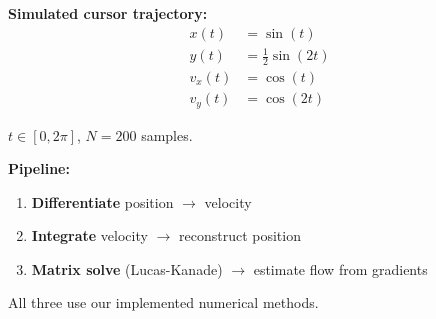 \documentclass[a4paper,landscape,12pt]{extarticle}
\newif\ifshownotes
\newcommand{\speakernotes}[2]{%
  \ifshownotes
    \vfill
    \begin{tcolorbox}[
      colback=gray!8, colframe=gray!50,
      title={\textbf{Speaker: #1} --- Verbatim Script},
      fonttitle=\large, fontupper=\normalsize,
      left=6pt, right=6pt, top=4pt, bottom=4pt
    ]
    #2
    \end{tcolorbox}
  \fi
}
\begin{document}
\begin{huge}
\leftskip 0.7in \rightskip 0.7in
\vspace{0.05in}

\begin{multicols}{2}
\textbf{Simulated cursor trajectory:}
\begin{align*}
x(t) &= \sin(t) \\
y(t) &= \tfrac{1}{2}\sin(2t) \\
v_x(t) &= \cos(t) \\
v_y(t) &= \cos(2t)
\end{align*}

$t \in [0, 2\pi]$, $N = 200$ samples.

\columnbreak

\textbf{Pipeline:}
\begin{enumerate}
  \item \textbf{Differentiate} position $\to$ velocity
  \item \textbf{Integrate} velocity $\to$ reconstruct position
  \item \textbf{Matrix solve} (Lucas-Kanade) $\to$ estimate flow from gradients
\end{enumerate}

\vspace{0.15in}
All three use our implemented numerical methods.
\end{multicols}

\leftskip 0in \rightskip 0in

\speakernotes{Jacky Li}{%
Now let us set up the problem we are applying these methods to. We simulate a cursor --- think of it as a mouse pointer or a tracked object --- moving along a \textbf{figure-8} path. The parametric equations are x of t equals sine t, and y of t equals one-half sine 2t. Taking derivatives gives us the true velocity: v-x equals cosine t, and v-y equals cosine 2t.

We sample this trajectory at N equals 200 equally spaced time points over one full period from zero to two pi.

Our analysis pipeline has three stages. First, we \textbf{numerically differentiate} the sampled position data to estimate velocity --- using the central difference formula we just discussed. Second, we \textbf{numerically integrate} the estimated velocity to reconstruct the original position, which lets us evaluate the round-trip accuracy. Third, we set up a \textbf{Lucas-Kanade matrix equation} to demonstrate how real optical flow solvers estimate motion from image gradients. Virgil will now explain the matrix math behind Lucas-Kanade.
}


\end{huge}
\end{document}
